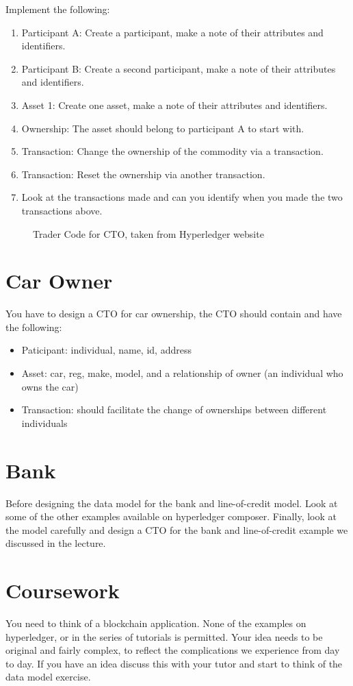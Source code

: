 Implement the following:
\begin{enumerate}
	\item Participant A: Create a participant, make a note of their attributes and identifiers.
	\item Participant B: Create a second participant, make a note of their attributes and identifiers.
	\item Asset 1: Create one asset, make a note of their attributes and identifiers.
	\item Ownership: The asset should belong to participant A to start with.
	\item Transaction: Change the ownership of the commodity via a transaction.
	\item Transaction: Reset the ownership via another transaction.
	\item Look at the transactions made and can you identify when you made the two transactions above.
\end{enumerate}




\begin{figure}\label{fi:traderCTO}
	
	\caption{Trader Code for CTO, taken from Hyperledger website}
\end{figure}


\section{Car Owner}
You have to design a CTO for car ownership, the CTO should contain and have the following:
\begin{itemize}
	\item Paticipant: individual, name, id, address
	\item Asset: car, reg, make, model, and a relationship of owner (an individual who owns the car)
	\item Transaction: should facilitate the change of ownerships between different individuals
\end{itemize}

\section{Bank}
Before designing the data model for the bank and line-of-credit model. Look at some of the other examples available on hyperledger composer. Finally, look at the model carefully and design a CTO for the bank and line-of-credit example we discussed in the lecture.

\section{Coursework}
You need to think of a blockchain application. None of the examples on hyperledger, or in the series of tutorials is permitted. Your idea needs to be original and fairly complex, to reflect the complications we experience from day to day. If you have an idea discuss this with your tutor and start to think of the data model exercise. 
